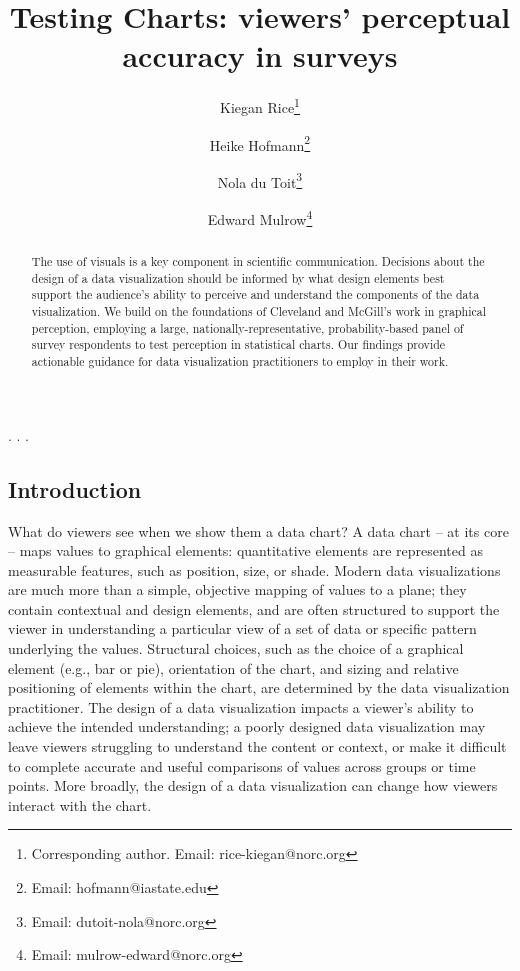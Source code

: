 \documentclass[
]{jds}
\author[1]{Kiegan Rice\thanks{Corresponding author. Email: rice-kiegan@norc.org}}
\author[2]{Heike Hofmann\footnote{Email: hofmann@iastate.edu}}
\author[1]{Nola du Toit\footnote{Email: dutoit-nola@norc.org}}
\author[1]{Edward Mulrow\footnote{Email: mulrow-edward@norc.org}}
\affil[1]{NORC at the University of Chicago}
\affil[2]{Department of Statistics, Iowa State University}
\title{Testing Charts: viewers' perceptual accuracy in surveys}
\author{}
\date{}
\begin{document}
\maketitle
\begin{abstract}
The use of visuals is a key component in scientific communication.
Decisions about the design of a data visualization should be informed by
what design elements best support the audience's ability to perceive and
understand the components of the data visualization. We build on the
foundations of Cleveland and McGill's work in graphical perception,
employing a large, nationally-representative, probability-based panel of
survey respondents to test perception in statistical charts. Our
findings provide actionable guidance for data visualization
practitioners to employ in their work.
\end{abstract}
\ifdefined\Shaded\renewenvironment{Shaded}{\begin{tcolorbox}[enhanced, boxrule=0pt, borderline west={3pt}{0pt}{shadecolor}, interior hidden, frame hidden, breakable, sharp corners]}{\end{tcolorbox}}\fi

  \newcommand{\hh}[1]{{\textcolor{orange}{#1}}} 
  \newcommand{\kr}[1]{{\textcolor{teal}{#1}}}.  
  \newcommand{\ejm}[1]{{\textcolor{ForestGreen}{#1}}}.  
  \newcommand{\ndt}[1]{{\textcolor{purple}{#1}}}.  


  \newcommand{\blandscape}{\begin{landscape}} 
  \newcommand{\elandscape}{\end{landscape}}

  \setlength{\parindent}{0pt}
  \singlespacing

\hypertarget{introduction}{%
\subsection{Introduction}\label{introduction}}

What do viewers see when we show them a data chart? A data chart -- at
its core -- maps values to graphical elements: quantitative elements are
represented as measurable features, such as position, size, or shade.
Modern data visualizations are much more than a simple, objective
mapping of values to a plane; they contain contextual and design
elements, and are often structured to support the viewer in
understanding a particular view of a set of data or specific pattern
underlying the values. Structural choices, such as the choice of a
graphical element (e.g., bar or pie), orientation of the chart, and
sizing and relative positioning of elements within the chart, are
determined by the data visualization practitioner. The design of a data
visualization impacts a viewer's ability to achieve the intended
understanding; a poorly designed data visualization may leave viewers
struggling to understand the content or context, or make it difficult to
complete accurate and useful comparisons of values across groups or time
points. More broadly, the design of a data visualization can change how
viewers interact with the chart.
\end{document}

